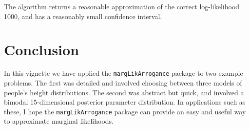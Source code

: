 \documentclass[letterpaper,12pt]{article}
\begin{document}
The algorithm returns a reasonable approximation of the correct
log-likelihood 1000, and has a reasonably small confidence interval.

\section{Conclusion}

In this vignette we have applied the \texttt{margLikArrogance} package
to two example problems.  The first was detailed and involved choosing
between three models of people's height distributions.  The second was
abstract but quick, and involved a bimodal 15-dimensional posterior
parameter distribution.  In applications such as these, I hope the
\texttt{margLikArrogance} package can provide an easy and useful way
to approximate marginal likelihoods.
\end{document}
